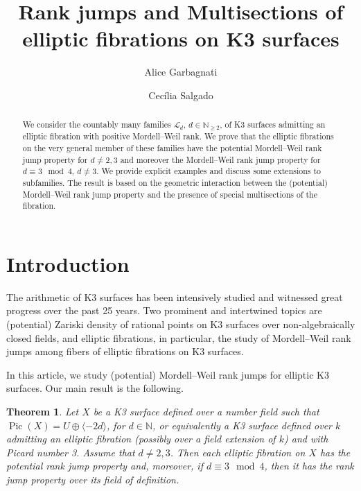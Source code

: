 \documentclass{amsart}
\author{Alice Garbagnati}
\author{Cec\'ilia Salgado}
\title[Rank jumps and Multisections on K3s ]{Rank jumps and Multisections of elliptic fibrations on K3 surfaces}
\newtheorem{theorem}{Theorem}[section]
\theoremstyle{definition}
\numberwithin{equation}{section}
\newcommand{\N}{\mathbb{N}}
\DeclareMathOperator{\Pic}{Pic}
\begin{document}
	
	



\maketitle
\begin{abstract} We consider the countably many families $\mathcal{L}_d$, $d\in\N_{\geq 2}$, of K3 surfaces admitting an elliptic fibration with positive Mordell--Weil rank. We prove that the elliptic fibrations on the very general member of these families have the potential  Mordell--Weil rank jump property for $d\neq 2,3$ and moreover the  Mordell--Weil rank jump property for $d\equiv 3\mod 4$, $d\neq 3$. We provide explicit examples and discuss some extensions to subfamilies. The result is based on the geometric interaction between the (potential) Mordell--Weil rank jump property and the presence of special multisections of the fibration. \end{abstract}

\section{Introduction}

The arithmetic of K3 surfaces has been intensively studied and witnessed great progress over the past 25 years. Two prominent and intertwined topics are (potential) Zariski density of rational points on K3 surfaces over non-algebraically closed fields, and elliptic fibrations, in particular, the study of Mordell--Weil rank jumps among fibers of elliptic fibrations on K3 surfaces. 


In this article, we study (potential) Mordell--Weil rank jumps for elliptic K3 surfaces. Our main result is the following.


\begin{theorem}\label{thm:rkjump}
Let $X$ be a K3 surface defined over a number field such that $\Pic(X)=U \oplus \langle -2d\rangle$, for $d\in\mathbb{N}$, or equivalently a K3 surface defined over $k$ admitting an elliptic fibration (possibly over a  field extension of $k$) and with Picard number 3. Assume that $d\neq 2,3$. Then each elliptic fibration on $X$ has the potential rank jump property and, moreover, if $d\equiv 3\mod 4$, then it has the rank jump property over its field of definition. 
\end{theorem}
\end{document}
